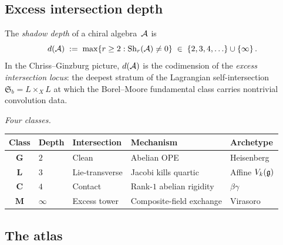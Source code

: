 \subsection{Excess intersection depth}%
\label{subsec:excess-intersection-depth}%

\begin{definition}%
\label{def:shadow-depth-intersection}%
%
The \emph{shadow depth} of a chiral algebra~$\mathcal{A}$
is
\[
 d(\mathcal{A})
 \;:=\;
 \max\{r \ge 2 : \operatorname{Sh}_r(\mathcal{A}) \ne 0\}
 \;\in\;
 \{2, 3, 4, \ldots\} \cup \{\infty\}\,.
\]
In the Chriss--Ginzburg picture, $d(\mathcal{A})$ is the codimension
of the \emph{excess intersection locus}: the deepest stratum
of the Lagrangian self-intersection
$\mathfrak{S}_b = L\times_X L$ at which the Borel--Moore
fundamental class carries nontrivial convolution data.

\smallskip
\noindent
\emph{Four classes.}
\begin{center}
\small
\renewcommand{\arraystretch}{1.3}
\begin{tabular}{cllll}
\toprule
\textbf{Class} & \textbf{Depth} & \textbf{Intersection} &
\textbf{Mechanism} & \textbf{Archetype} \\
\midrule
$\mathbf{G}$ & $2$ & Clean &
 Abelian OPE & Heisenberg \\
$\mathbf{L}$ & $3$ & Lie-transverse &
 Jacobi kills quartic & Affine $V_k(\mathfrak{g})$ \\
$\mathbf{C}$ & $4$ & Contact &
 Rank-$1$ abelian rigidity & $\beta\gamma$ \\
$\mathbf{M}$ & $\infty$ & Excess tower &
 Composite-field exchange & Virasoro \\
\bottomrule
\end{tabular}
\end{center}
\end{definition}

\subsection{The atlas}%
\label{subsec:atlas}%

